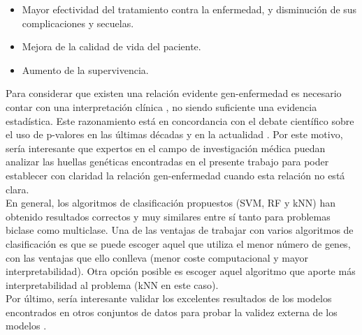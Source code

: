 \begin{itemize}
	\item Mayor efectividad del tratamiento contra la enfermedad, y disminución de sus complicaciones y secuelas.
	\item Mejora de la calidad de vida del paciente.
	\item Aumento de la supervivencia.
\end{itemize}

Para considerar que existen una relación evidente gen-enfermedad es necesario contar con una interpretación clínica \cite{Drier2011}, no siendo suficiente una evidencia estadística. Este razonamiento  está en concordancia con el debate científico sobre el uso de p-valores en las últimas décadas \cite{Evans1988, Goodman1999, Matthews2000} y en la actualidad \cite{McShane2019, Wasserstein2019}. Por este motivo, sería interesante que expertos en el campo de investigación médica puedan analizar las huellas genéticas encontradas en el presente trabajo para poder establecer con claridad la relación gen-enfermedad cuando esta relación no está clara.\\

En general, los algoritmos de clasificación propuestos (SVM, RF y kNN) han obtenido resultados correctos y muy similares entre sí tanto para problemas biclase como multiclase. Una de las ventajas de trabajar con varios algoritmos de clasificación es que se puede escoger aquel que utiliza el menor número de genes, con las ventajas que ello conlleva (menor coste computacional y mayor interpretabilidad). Otra opción posible es escoger aquel algoritmo que aporte más interpretabilidad al problema (kNN en este caso). \\

Por último, sería interesante validar los excelentes resultados de los modelos encontrados en otros conjuntos de datos para probar la validez externa de los modelos \cite{Steckler2008}.\\